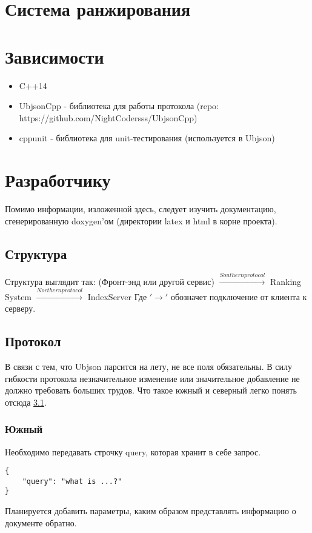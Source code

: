 \documentclass[12pt,a4paper]{article}
\begin{document}
\section{Система ранжирования}



\section{Зависимости}

\begin{itemize}
    \item C++14
    \item UbjsonCpp  - библиотека для работы протокола (repo: https://github.com/NightCodersss/UbjsonCpp)
    \item cppunit - библиотека для unit-тестирования (используется в Ubjson)
\end{itemize}

\section{Разработчику}
Помимо информации, изложенной здесь, следует изучить документацию, сгенерированную doxygen'ом (директории latex и html в корне проекта).

\subsection{Структура}
\label{subsec:generalStructure}
Структура выглядит так:
(Фронт-энд или другой сервис) $\xrightarrow{Southern protocol}$ Ranking System $\xrightarrow{Northern protocol}$ IndexServer
Где $'\rightarrow'$ обозначет подключение от клиента к серверу.

\subsection{Протокол}
В связи с тем, что Ubjson парсится на лету, не все поля обязательны. 
В силу гибкости протокола незначительное изменение или значительное добавление не должно требовать больших трудов.
Что такое южный и северный легко понять отсюда \ref{subsec:generalStructure}.

\subsubsection{Южный}
Необходимо передавать строчку query, которая хранит в себе запрос.
\begin{verbatim}
{
	"query": "what is ...?"
}
\end{verbatim}
Планируется добавить параметры, каким образом представлять информацию о документе обратно.
\end{document}
